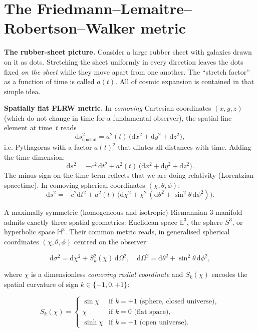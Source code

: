 \documentclass[11pt,a4paper,openany]{report}
\newcommand{\dif}{\mathrm{d}}
\begin{document}
\section{The Friedmann--Lemaitre--Robertson--Walker metric}

\begin{tcolorbox}[plain]
\textbf{The rubber-sheet picture.} Consider a large rubber sheet with galaxies
drawn on it as dots. Stretching the sheet uniformly in every direction leaves
the dots fixed \emph{on the sheet} while they move apart from one another.
The “stretch factor” as a function of time is called $a(t)$. All of cosmic
expansion is contained in that simple idea.
\end{tcolorbox}

\begin{tcolorbox}[undergrad]
\textbf{Spatially flat FLRW metric.} In \emph{comoving} Cartesian coordinates
$(x,y,z)$ (which do not change in time for a fundamental observer), the spatial
line element at time~$t$ reads
\[
\dif s^{2}_{\text{spatial}} = a^{2}(t)\,\bigl(\dif x^{2} + \dif y^{2} + \dif z^{2}\bigr),
\]
i.e. Pythagoras with a factor $a(t)^{2}$ that dilates all distances with time.
Adding the time dimension:
\[
\dif s^{2} = -c^{2}\,\dif t^{2} + a^{2}(t)\,\bigl(\dif x^{2} + \dif y^{2} + \dif z^{2}\bigr).
\]
The minus sign on the time term reflects that we are doing relativity
(Lorentzian spacetime). In comoving spherical coordinates $(\chi, \theta, \phi)$:
\[
\dif s^{2} = -c^{2}\dif t^{2} + a^{2}(t)\,\bigl(\dif\chi^{2}
+ \chi^{2}\,(\dif\theta^{2} + \sin^{2}\theta\,\dif\phi^{2})\bigr).
\]
\end{tcolorbox}

A maximally symmetric (homogeneous and isotropic) Riemannian 3-manifold admits
exactly three spatial geometries: Euclidean space $\mathbb{E}^{3}$, the sphere
$S^{3}$, or hyperbolic space $\mathbb{H}^{3}$. Their common metric reads, in
generalised spherical coordinates $(\chi,\theta,\phi)$ centred on the observer:

\begin{equation}
\dif\sigma^{2} = \dif\chi^{2} + S_{k}^{2}(\chi)\,\dif\Omega^{2},
\quad \dif\Omega^{2} = \dif\theta^{2} + \sin^{2}\theta\,\dif\phi^{2},
\label{eq:dsigma}
\end{equation}

\noindent where $\chi$ is a dimensionless \emph{comoving radial coordinate} and
$S_{k}(\chi)$ encodes the spatial curvature of sign $k\in\{-1,0,+1\}$:

\begin{equation}
S_{k}(\chi) =
\begin{cases}
\sin\chi      & \text{if } k=+1 \text{ (sphere, closed universe)},\\
\chi          & \text{if } k=0 \text{ (flat space)},\\
\sinh\chi     & \text{if } k=-1 \text{ (open universe)}.
\end{cases}
\label{eq:Sk}
\end{equation}
\end{document}
